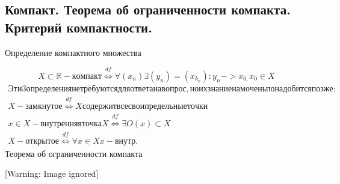 \documentclass[a4paper]{article}
\begin{document}
\subsection{Компакт. Теорема об ограниченности компакта. Критерий компактности. }
Определение компактного множества

\begin{equation*}
X\subset
\mathbb{R}-\mathit{\text{к}\text{о}\text{м}\text{п}\text{а}\text{к}\text{т}}\overset{\mathit{df}}{\Leftrightarrow
}\forall (x_n)\exists (y_n)=(x_{k_n}):y_n->x_{0,}x_0\in X
\end{equation*}
\begin{equation*}
\begin{gathered}\mathit{\text{Э}\text{т}\text{и}}3\mathit{\text{о}\text{п}\text{р}\text{е}\text{д}\text{е}\text{л}\text{е}\text{н}\text{и}\text{я}}\mathit{\text{н}\text{е}}\mathit{\text{т}\text{р}\text{е}\text{б}\text{у}\text{ю}\text{т}\text{с}\text{я}}\mathit{\text{д}\text{л}\text{я}}\mathit{\text{о}\text{т}\text{в}\text{е}\text{т}\text{а}}\mathit{\text{н}\text{а}}\mathit{\text{в}\text{о}\text{п}\text{р}\text{о}\text{с}},\mathit{\text{н}\text{о}}\mathit{\text{и}\text{х}}\mathit{\text{з}\text{н}\text{а}\text{н}\text{и}\text{е}}\mathit{\text{н}\text{а}\text{м}}\mathit{\text{о}\text{ч}\text{е}\text{н}\text{ь}}\mathit{\text{п}\text{о}\text{н}\text{а}\text{д}\text{о}\text{б}\text{и}\text{т}\text{с}\text{я}}\mathit{\text{п}\text{о}\text{з}\text{ж}\text{е}}:\\X-\mathit{\text{з}\text{а}\text{м}\text{к}\text{н}\text{у}\text{т}\text{о}\text{е}}\overset{\mathit{df}}{\Leftrightarrow
}X\mathit{\text{с}\text{о}\text{д}\text{е}\text{р}\text{ж}\text{и}\text{т}}\mathit{\text{в}\text{с}\text{е}}\mathit{\text{с}\text{в}\text{о}\text{и}}\mathit{\text{п}\text{р}\text{е}\text{д}\text{е}\text{л}\text{ь}\text{н}\text{ы}\text{е}}\mathit{\text{т}\text{о}\text{ч}\text{к}\text{и}}\\x\in
X-\mathit{\text{в}\text{н}\text{у}\text{т}\text{р}\text{е}\text{н}\text{н}\text{я}\text{я}}\mathit{\text{т}\text{о}\text{ч}\text{к}\text{а}}X\overset{\mathit{df}}{\Leftrightarrow
}\exists O(x)\subset
X\\X-\mathit{\text{о}\text{т}\text{к}\text{р}\text{ы}\text{т}\text{о}\text{е}}\overset{\mathit{df}}{\Leftrightarrow
}\forall x\in Xx-\mathit{\text{в}\text{н}\text{у}\text{т}\text{р}.}\end{gathered}
\end{equation*}
Теорема об ограниченности компакта

  [Warning: Image ignored] %
 
\end{document}
